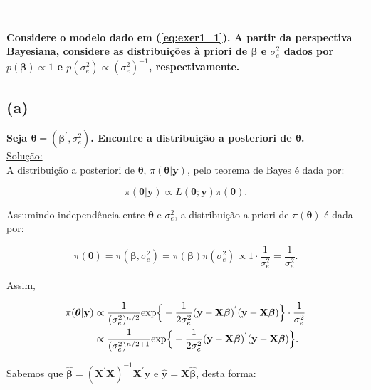 \documentclass[12pt, oldfontcommands]{article}\usepackage[]{graphicx}\usepackage[]{color}
\newcommand{\horrule}[1]{\rule{\linewidth}{#1}}
\begin{document}
\horrule{1pt} \\

\textbf{Considere o modelo dado em (\ref{eq:exer1_1}). A partir da
        perspectiva Bayesiana, considere as distribuições à priori de
        \(\bm{\beta}\) e \(\sigma_{e}^{2}\) dados por
        \(p(\bm{\beta}) \propto 1\) e
        \(p(\sigma_{e}^{2}) \propto (\sigma_{e}^{2})^{-1}\),
        respectivamente.}

\subsection*{(a)} 

\textbf{Seja \(\bm{\theta} = (\bm{\beta}^{'}, \sigma_{e}^{2})\).
        Encontre a distribuição a posteriori de \(\bm{\theta}\).} \\

\underline{Solução:} \\

A distribuição a posteriori de \(\bm{\theta}\),
\(\pi(\bm{\theta} | \mathbf{y})\), pelo teorema de Bayes é dada por:

\[ \pi(\bm{\theta} | \mathbf{y}) \propto
   L(\bm{\theta}; \mathbf{y}) \pi(\bm{\theta}). \]

Assumindo independência entre \(\bm{\theta}\) e \(\sigma_{e}^{2}\), a
distribuição a priori de \(\pi(\bm{\theta})\) é dada por:

\[ \pi(\bm{\theta}) = \pi(\bm{\beta}, \sigma_{e}^{2}) =
   \pi(\bm{\beta}) \pi(\sigma_{e}^{2}) \propto
   1 \cdot \frac{1}{\sigma_{e}^{2}} = \frac{1}{\sigma_{e}^{2}}. \]

Assim,

\begin{align*}
 \pi(\bm{\theta} | \mathbf{y}) & \propto
 \frac{1}{(\sigma_{e}^{2})^{n/2}}
 {\rm exp}\Big\{-\frac{1}{2\sigma_{e}^{2}}
 (\mathbf{y} - \mathbf{X} \bm{\beta})^{'}
 (\mathbf{y} - \mathbf{X} \bm{\beta})\Big\} \cdot
 \frac{1}{\sigma_{e}^{2}} \\ & \propto
 \frac{1}{(\sigma_{e}^{2})^{n/2 + 1}}
 {\rm exp}\Big\{-\frac{1}{2\sigma_{e}^{2}}
 (\mathbf{y} - \mathbf{X} \bm{\beta})^{'}
 (\mathbf{y} - \mathbf{X} \bm{\beta})\Big\}.
\end{align*}

Sabemos que \(\hat{\bm{\beta}} =
              (\mathbf{X}^{'}\mathbf{X})^{-1}\mathbf{X}^{'}\mathbf{y}\)
e \(\hat{\mathbf{y}} = \mathbf{X}\hat{\bm{\beta}}\), desta forma:
\end{document}
